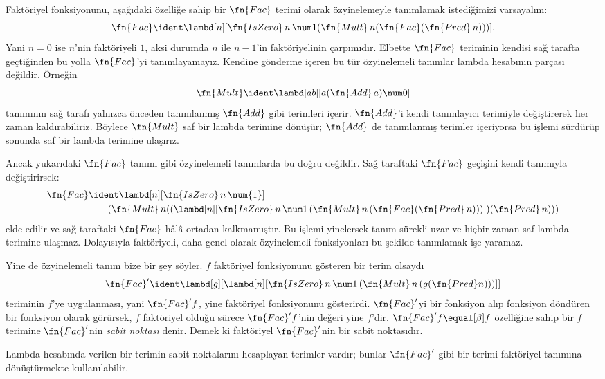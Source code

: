 \documentclass[../../../include/open-logic-section]{subfiles}
\begin{document}


Faktöriyel fonksiyonunu, aşağıdaki özelliğe sahip bir $\fn{Fac}$ terimi olarak
özyinelemeyle tanımlamak istediğimizi varsayalım:
\[
\fn{Fac} \ident \lambd[n][\fn{IsZero}\, n\, \num 1
  (\fn{Mult}\, n (\fn{Fac}(\fn{Pred} \, n)))].
\]
Yani $n=0$ ise $n$'nin faktöriyeli $1$, aksi durumda $n$ ile $n-1$'in
faktöriyelinin çarpımıdır. Elbette $\fn{Fac}$ teriminin kendisi sağ tarafta
geçtiğinden bu yolla $\fn{Fac}$'yi tanımlayamayız. Kendine gönderme içeren bu
tür özyinelemeli tanımlar lambda hesabının parçası değildir. Örneğin
\[
\fn{Mult} \ident \lambd[ab][a (\fn{Add}\, a) \num0]
\]
tanımının sağ tarafı yalnızca önceden tanımlanmış $\fn{Add}$ gibi terimleri
içerir. $\fn{Add}$'i kendi tanımlayıcı terimiyle değiştirerek her zaman
kaldırabiliriz. Böylece $\fn{Mult}$ saf bir lambda terimine dönüşür;
$\fn{Add}$ de tanımlanmış terimler içeriyorsa bu işlemi sürdürüp sonunda saf
bir lambda terimine ulaşırız.

Ancak yukarıdaki $\fn{Fac}$ tanımı gibi özyinelemeli tanımlarda bu doğru
değildir. Sağ taraftaki $\fn{Fac}$ geçişini kendi tanımıyla değiştirirsek:
\begin{align*}
  \fn{Fac} & \ident \lambd[n][\fn{IsZero}\, n\, \num{1}] \\
    & \qquad (\fn{Mult}\, n
  ((\lambd[n][\fn{IsZero} \, n \, \num 1\, (\fn{Mult}\, n\, (\fn{Fac}
    (\fn{Pred}\, n)))]) (\fn{Pred}\, n)))
\end{align*}
elde edilir ve sağ taraftaki $\fn{Fac}$ hâlâ ortadan kalkmamıştır. Bu işlemi
yinelersek tanım sürekli uzar ve hiçbir zaman saf lambda terimine ulaşmaz.
Dolayısıyla faktöriyeli, daha genel olarak özyinelemeli fonksiyonları bu
şekilde tanımlamak işe yaramaz.

Yine de özyinelemeli tanım bize bir şey söyler. $f$ faktöriyel fonksiyonunu
gösteren bir terim olsaydı
\[
\fn{Fac}' \ident \lambd[g][\lambd[n][\fn{IsZero} \, n \, \num 1\,
  (\fn{Mult} \, n\, (g (\fn{Pred} n)))]]
\]
teriminin $f$'ye uygulanması, yani $\fn{Fac}'f$, yine faktöriyel
fonksiyonunu gösterirdi. $\fn{Fac}'$yi bir fonksiyon alıp fonksiyon döndüren
bir fonksiyon olarak görürsek, $f$ faktöriyel olduğu sürece
$\fn{Fac}'f$'nin değeri yine $f$'dir. $\fn{Fac}'f\equal[\beta]f$ özelliğine
sahip bir $f$ terimine $\fn{Fac}'$nin \emph{sabit noktası} denir. Demek ki
faktöriyel $\fn{Fac}'$nin bir sabit noktasıdır.

Lambda hesabında verilen bir terimin sabit noktalarını hesaplayan terimler
vardır; bunlar $\fn{Fac}'$ gibi bir terimi faktöriyel tanımına dönüştürmekte
kullanılabilir.
\end{document}

